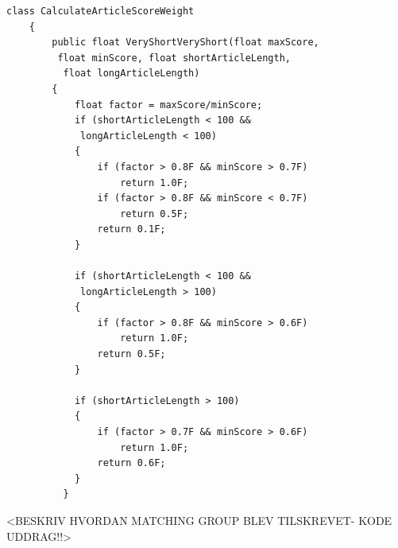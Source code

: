 \lstset{style=sharpc}
\begin{lstlisting}[caption=Part of the method for applying LCS score weight, captionpos=b]
 class CalculateArticleScoreWeight
    {
        public float VeryShortVeryShort(float maxScore,
         float minScore, float shortArticleLength,
          float longArticleLength)
        {
            float factor = maxScore/minScore;
            if (shortArticleLength < 100 &&
             longArticleLength < 100)
            {
                if (factor > 0.8F && minScore > 0.7F)
                    return 1.0F;
                if (factor > 0.8F && minScore < 0.7F)
                    return 0.5F;
                return 0.1F;
            }

            if (shortArticleLength < 100 &&
             longArticleLength > 100)
            {
                if (factor > 0.8F && minScore > 0.6F)
                    return 1.0F;
                return 0.5F;
            }

            if (shortArticleLength > 100)
            {
                if (factor > 0.7F && minScore > 0.6F)
                    return 1.0F;
                return 0.6F;
            }
          }

\end{lstlisting}

<BESKRIV HVORDAN MATCHING GROUP BLEV TILSKREVET- KODE UDDRAG!!>




